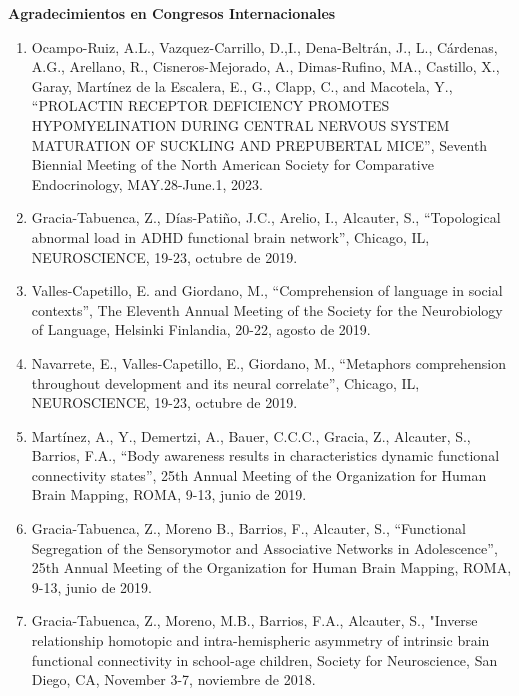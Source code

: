 \textbf{Agradecimientos en Congresos Internacionales}

\hfill

\begin{enumerate}

\item Ocampo-Ruiz, A.L., Vazquez-Carrillo, D.,I., Dena-Beltrán, J., L., Cárdenas, A.G., Arellano, R., Cisneros-Mejorado, A., 
Dimas-Rufino, MA., Castillo, X., Garay, Martínez de la Escalera, E., G., Clapp, C., and Macotela, Y., “PROLACTIN RECEPTOR 
DEFICIENCY PROMOTES HYPOMYELINATION DURING CENTRAL NERVOUS SYSTEM MATURATION OF SUCKLING AND PREPUBERTAL MICE”, Seventh 
Biennial Meeting of the North American Society for Comparative Endocrinology, MAY.28-June.1, 2023.

\item Gracia-Tabuenca, Z., Días-Patiño, J.C., Arelio, I., Alcauter, S., “Topological abnormal load in ADHD functional brain 
network”, Chicago, IL, NEUROSCIENCE, 19-23, octubre de 2019.

\item Valles-Capetillo, E. and Giordano, M., “Comprehension of language in social contexts”, The Eleventh Annual Meeting of 
the Society for the Neurobiology of Language, Helsinki Finlandia, 20-22, agosto de 
2019.

\item Navarrete, E., Valles-Capetillo, E., Giordano, M., “Metaphors comprehension throughout development and its neural 
correlate”, Chicago, IL, NEUROSCIENCE, 19-23, octubre de 2019.

\item Martínez, A., Y., Demertzi, A., Bauer, C.C.C., Gracia, Z., Alcauter, S., Barrios, F.A., “Body awareness results in 
characteristics dynamic functional connectivity states”, 25th Annual Meeting of the Organization for Human Brain Mapping, 
ROMA, 9-13, junio de 2019.

\item Gracia-Tabuenca, Z., Moreno B., Barrios, F., Alcauter, S., “Functional Segregation of the Sensorymotor and Associative 
Networks in Adolescence”, 25th Annual Meeting of the Organization for Human Brain Mapping, ROMA, 9-13, junio de 2019.

\item Gracia-Tabuenca, Z., Moreno, M.B., Barrios, F.A., Alcauter, S., "Inverse relationship homotopic and intra-hemispheric 
asymmetry of intrinsic brain functional connectivity in school-age children, Society for Neuroscience, San Diego, CA, 
November 3-7, noviembre de 2018.


\end{enumerate}
